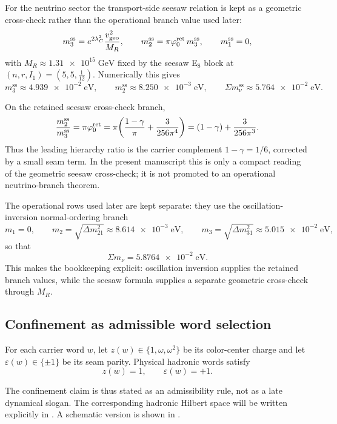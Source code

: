 For the neutrino sector the transport-side seesaw relation is kept as a geometric cross-check rather than the operational branch value used later:
\begin{equation}
\label{eq:neutrino-masses}
m_3^{\mathrm{ss}}=e^{2\lambda_C^2}\frac{v_{\mathrm{geo}}^2}{M_R},
\qquad
m_2^{\mathrm{ss}}=\pi\varphi_0^{\mathrm{ret}}\,m_3^{\mathrm{ss}},
\qquad
m_1^{\mathrm{ss}}=0,
\end{equation}
with $M_R\approx\num{1.31e15}\;\mathrm{GeV}$ fixed by the seesaw E$_8$ block at $(n,r,I_1)=(5,5,\frac{1}{12})$. Numerically this gives
\[
\!m_3^{\mathrm{ss}}\approx\num{4.939e-2}\;\mathrm{eV},
\qquad
\!m_2^{\mathrm{ss}}\approx\num{8.250e-3}\;\mathrm{eV},
\qquad
\Sigma m_\nu^{\mathrm{ss}}\approx\num{5.764e-2}\;\mathrm{eV}.
\]
\begin{remark}
On the retained seesaw cross-check branch,
\[
\frac{m_2^{\mathrm{ss}}}{m_3^{\mathrm{ss}}}
=
\pi\varphi_0^{\mathrm{ret}}
=
\pi\!\left(\frac{1-\gamma}{\pi}+\frac{3}{256\pi^4}\right)
=
(1-\gamma)+\frac{3}{256\pi^3}.
\]
Thus the leading hierarchy ratio is the carrier complement $1-\gamma=1/6$, corrected by a small seam term. In the present manuscript this is only a compact reading of the geometric seesaw cross-check; it is not promoted to an operational neutrino-branch theorem.
\end{remark}
The operational rows used later are kept separate: they use the oscillation-inversion normal-ordering branch
\[
m_1=0,
\qquad
m_2=\sqrt{\Delta m_{21}^2}\approx\num{8.614e-3}\;\mathrm{eV},
\qquad
m_3=\sqrt{\Delta m_{31}^2}\approx\num{5.015e-2}\;\mathrm{eV},
\]
so that
\[
\Sigma m_\nu=\num{5.8764e-2}\;\mathrm{eV}.
\]
This makes the bookkeeping explicit: oscillation inversion supplies the retained branch values, while the seesaw formula supplies a separate geometric cross-check through $M_R$.

\subsection{Confinement as admissible word selection}

\begin{proposition}
For each carrier word $w$, let $z(w)\in\{1,\omega,\omega^2\}$ be its color-center charge and let $\varepsilon(w)\in\{\pm1\}$ be its seam parity. Physical hadronic words satisfy
\[
z(w)=1,
\qquad
\varepsilon(w)=+1.
\]
\end{proposition}

The confinement claim is thus stated as an admissibility rule, not as a late dynamical slogan. The corresponding hadronic Hilbert space will be written explicitly in . A schematic version is shown in .

